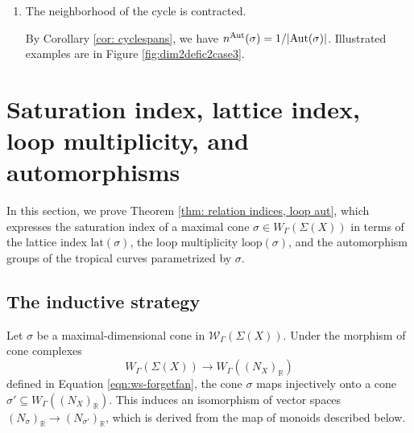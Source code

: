 \documentclass{article}
\def\Z{\mathbb{Z}}
\def\Aut{{\rm Aut}}
\newcommand{\nn}{n^{\operatorname{Aut}}}
\begin{document}
\begin{enumerate}
\begin{enumerate}
\begin{enumerate}[label=(\roman*)]
\end{enumerate}

In all cases, as in the case $\dim(X)=1$ with deficiency $1$ Case (a), we deduce that 
\[
\nn(\sigma)=\frac{d-1}{|\Aut(\sigma)|}.
\]
Here $d \in \Z_{>0}$ is such that $\pm d \cdot u$ are the direction vectors of the non-contracted edges adjacent to $V_1$ and $u \in N_X$ primitive. 

    \item The neighborhood of the cycle is contracted.

    By Corollary \ref{cor: cyclespans}, we have $\nn(\sigma) = 1/|\Aut(\sigma)|$. Illustrated examples are in Figure \ref{fig:dim2defic2case3}.

    
\end{enumerate}

 

\end{enumerate}


\section{Saturation index, lattice index, loop multiplicity, and automorphisms} 
\label{sec: curves-in-Nx}

In this section, we prove Theorem \ref{thm: relation indices, loop aut}, which expresses the saturation index of a maximal cone $\sigma \in W_\Gamma(\Sigma(X))$ in terms of the lattice index $\mathrm{lat}(\sigma)$, the loop multiplicity $\mathrm{loop}(\sigma)$, and the automorphism groups of the tropical curves parametrized by $\sigma$.

\subsection{The inductive strategy}\label{sec: induction}

Let $\sigma$ be a maximal-dimensional cone in $\mathcal{W}_\Gamma(\Sigma(X))$. Under the morphism of cone complexes 
\[
W_\Gamma(\Sigma(X)) \rightarrow W_\Gamma((N_X)_{\mathbb{R}})
\]
defined in Equation \eqref{eqn:ws-forgetfan}, the cone $\sigma$ maps injectively onto a cone $\sigma' \subseteq W_\Gamma((N_X)_{\mathbb{R}})$. This induces an isomorphism of vector spaces $(N_\sigma)_{\mathbb{R}} \to (N_{\sigma'})_{\mathbb{R}}$, which is derived from the map of monoids described below.
\end{document}
